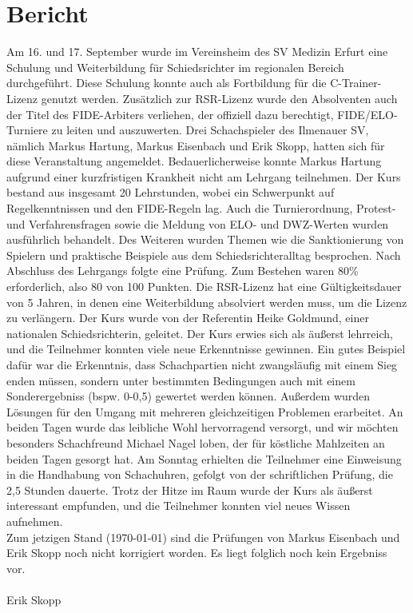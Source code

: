 \documentclass[a4paper,german]{tui-algo-seminar}
\title{\content}
\author{Erik Skopp}
\newcommand{\content}{Regionaler-Schiedsrichter-Lehrgang des Thüringer Schachbundes im September 2023}
\begin{document}
\maketitle

\begin{abstract}
\content
\end{abstract}

\section{Bericht}
Am 16. und 17. September wurde im Vereinsheim des SV Medizin Erfurt eine Schulung und Weiterbildung für Schiedsrichter im regionalen Bereich durchgeführt. Diese Schulung konnte auch als Fortbildung für die C-Trainer-Lizenz genutzt werden. Zusätzlich zur RSR-Lizenz wurde den Absolventen auch der Titel des FIDE-Arbiters verliehen, der offiziell dazu berechtigt, FIDE/ELO-Turniere zu leiten und auszuwerten. Drei Schachspieler des Ilmenauer SV, nämlich Markus Hartung, Markus Eisenbach und Erik Skopp, hatten sich für diese Veranstaltung angemeldet. Bedauerlicherweise konnte Markus Hartung aufgrund einer kurzfristigen Krankheit nicht am Lehrgang teilnehmen.
Der Kurs bestand aus insgesamt 20 Lehrstunden, wobei ein Schwerpunkt auf Regelkenntnissen und den FIDE-Regeln lag. Auch die Turnierordnung, Protest- und Verfahrensfragen sowie die Meldung von ELO- und DWZ-Werten wurden ausführlich behandelt. Des Weiteren wurden Themen wie die Sanktionierung von Spielern und praktische Beispiele aus dem Schiedsrichteralltag besprochen.
Nach Abschluss des Lehrgangs folgte eine Prüfung. Zum Bestehen waren 80\% erforderlich, also 80 von 100 Punkten. Die RSR-Lizenz hat eine Gültigkeitsdauer von 5 Jahren, in denen eine Weiterbildung absolviert werden muss, um die Lizenz zu verlängern. Der Kurs wurde von der Referentin Heike Goldmund, einer nationalen Schiedsrichterin, geleitet.
Der Kurs erwies sich als äußerst lehrreich, und die Teilnehmer konnten viele neue Erkenntnisse gewinnen. Ein gutes Beispiel dafür war die Erkenntnis, dass Schachpartien nicht zwangsläufig mit einem Sieg enden müssen, sondern unter bestimmten Bedingungen auch mit einem Sonderergebniss (bspw. 0-0,5) gewertet werden können. Außerdem wurden Lösungen für den Umgang mit mehreren gleichzeitigen Problemen erarbeitet. An beiden Tagen wurde das leibliche Wohl hervorragend versorgt, und wir möchten besonders Schachfreund Michael Nagel loben, der für köstliche Mahlzeiten an beiden Tagen gesorgt hat.
Am Sonntag erhielten die Teilnehmer eine Einweisung in die Handhabung von Schachuhren, gefolgt von der schriftlichen Prüfung, die 2,5 Stunden dauerte. Trotz der Hitze im Raum wurde der Kurs als äußerst interessant empfunden, und die Teilnehmer konnten viel neues Wissen aufnehmen.\\
Zum jetzigen Stand (\today) sind die Prüfungen von Markus Eisenbach und Erik Skopp noch nicht korrigiert worden. Es liegt folglich noch kein Ergebniss vor.\\
\\
Erik Skopp
\end{document}
